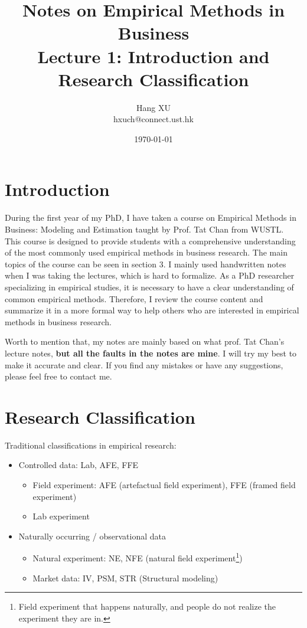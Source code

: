 \documentclass[12pt, a4paper]{article}
\begin{document}

\title{Notes on Empirical Methods in Business \\ Lecture 1: Introduction and Research Classification}
\author{Hang XU \\hxuch@connect.ust.hk}
\date{\today}
\maketitle

\section{Introduction}
During the first year of my PhD, I have taken a course on Empirical Methods in Business: Modeling and Estimation taught by Prof. Tat Chan from WUSTL. 
This course is designed to provide students with a comprehensive understanding of the most commonly used empirical methods in business research. The main topics of the course can be seen in section 3. 
I mainly used handwritten notes when I was taking the lectures, which is hard to formalize. As a PhD researcher specializing in empirical studies, it is necessary to have a clear understanding of common empirical methods.
Therefore, I review the course content and summarize it in a more formal way to help others who are interested in empirical methods in business research.

Worth to mention that, my notes are mainly based on what prof. Tat Chan's lecture notes, \textbf{but all the faults in the notes are mine}. I will try my best to make it accurate and clear. If you find any mistakes or have any suggestions, please feel free to contact me.


\section{Research Classification}

Traditional classifications in empirical research:
\begin{itemize}
    \item Controlled data: Lab, AFE, FFE
    \begin{itemize}
        \item Field experiment: AFE (artefactual field experiment), FFE (framed field experiment)
        \item Lab experiment
    \end{itemize}
    \item Naturally occurring / observational data
    \begin{itemize}
        \item Natural experiment: NE, NFE (natural field experiment\footnote{Field experiment that happens naturally, and people do not realize the experiment they are in.})
        \item Market data: IV, PSM, STR (Structural modeling)
    \end{itemize}
\end{itemize}
\end{document}
